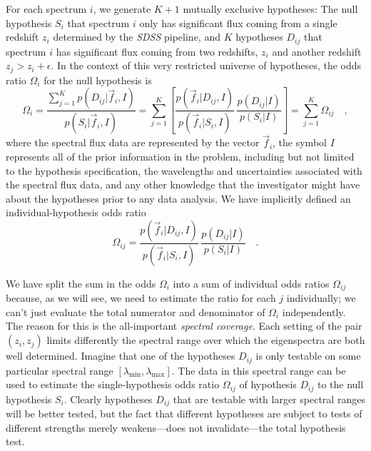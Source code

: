 \documentclass[12pt]{article}
\newcommand{\facility}[1]{\textsl{#1}}
\newcommand{\fluxvec}{\vec{f}}
\begin{document}
For each spectrum $i$, we generate $K+1$ mutually exclusive hypotheses:
The null hypothesis $S_i$ that spectrum $i$ only has significant flux
coming from a single redshift $z_i$ determined by the \facility{SDSS}
pipeline, and $K$ hypotheses $D_{ij}$ that spectrum $i$ has significant
flux coming from two redshifts, $z_i$ and another redshift
$z_j>z_i+\epsilon$.  In the context of this very restricted universe
of hypotheses, the odds ratio $\Omega_i$ for the null hypothesis is
\begin{equation}\label{eq:odds}
\Omega_i = \frac{\sum_{j=1}^K p(D_{ij}|\fluxvec_i,I)}{p(S_i|\fluxvec_i,I)}
 = \sum_{j=1}^K \left[\frac{p(\fluxvec_i|D_{ij},I)}{p(\fluxvec_i|S_i,I)}
 \,\frac{p(D_{ij}|I)}{p(S_i|I)}\right] = \sum_{j=1}^K\Omega_{ij}\quad,
\end{equation}
where the spectral flux data are represented by the vector
$\fluxvec_i$, the symbol $I$ represents all of the prior information
in the problem, including but not limited to the hypothesis
specification, the wavelengths and uncertainties associated with the
spectral flux data, and any other knowledge that the investigator
might have about the hypotheses prior to any data analysis.  We have
implicitly defined an individual-hypothesis odds ratio
\begin{equation}
\Omega_{ij} = \frac{p(\fluxvec_i|D_{ij},I)}{p(\fluxvec_i|S_i,I)}
  \,\frac{p(D_{ij}|I)}{p(S_i|I)}\quad.
\end{equation}

We have split the sum in the odds $\Omega_i$ into a sum of individual
odds ratios $\Omega_{ij}$ because, as we will see, we need to estimate
the ratio for each $j$ individually; we can't just evaluate the total
numerator and denominator of $\Omega_i$ independently.  The reason for
this is the all-important \emph{spectral coverage}.  Each setting of
the pair $(z_i,z_j)$ limits differently the spectral range over which
the eigenspectra are both well determined.  Imagine that one of the
hypotheses $D_{ij}$ is only testable on some particular spectral range
$[\lambda_{\min},\lambda_{\max}]$.  The data in this spectral range
can be used to estimate the single-hypothesis odds ratio $\Omega_{ij}$
of hypothesis $D_{ij}$ to the null hypothesis $S_i$.  Clearly
hypotheses $D_{ij}$ that are testable with larger spectral ranges will
be better tested, but the fact that different hypotheses are subject
to tests of different strengths merely weakens---does not
invalidate---the total hypothesis test.
\end{document}
